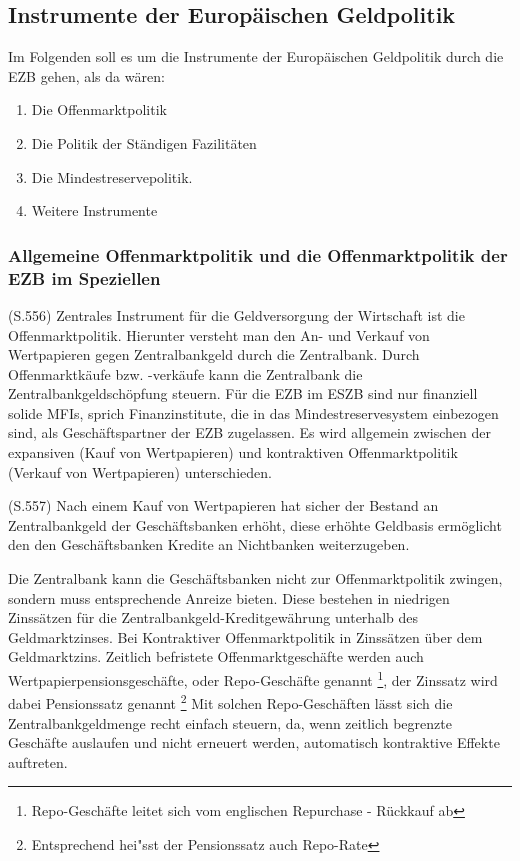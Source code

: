 \documentclass[
        onecolumn,
        a4paper,
        abstracton,
        parskip=half
        ,final
        ]{scrartcl}
\begin{document}
\subsection{Instrumente der Europ{\"a}ischen Geldpolitik}

Im Folgenden soll es um die Instrumente der Europ{\"a}ischen Geldpolitik durch die EZB gehen, als da w{\"a}ren:
\begin{enumerate}
  \item{Die Offenmarktpolitik}
  \item{Die Politik der St{\"a}ndigen Fazilit{\"a}ten}
  \item{Die Mindestreservepolitik.}
  \item{Weitere Instrumente}
\end{enumerate}




\subsubsection{Allgemeine Offenmarktpolitik und die Offenmarktpolitik der EZB im Speziellen}

(S.556)
Zentrales Instrument f{\"u}r die Geldversorgung der Wirtschaft ist die Offenmarktpolitik. Hierunter versteht man den An- und Verkauf von Wertpapieren gegen Zentralbankgeld durch die Zentralbank.
Durch Offenmarktk{\"a}ufe bzw. -verk{\"a}ufe kann die Zentralbank die Zentralbankgeldsch{\"o}pfung steuern. F{\"u}r die EZB im ESZB sind nur finanziell solide MFIs, sprich Finanzinstitute, die in das Mindestreservesystem einbezogen sind, als Gesch{\"a}ftspartner der EZB zugelassen.
Es wird allgemein zwischen der expansiven (Kauf von Wertpapieren) und kontraktiven Offenmarktpolitik (Verkauf von Wertpapieren) unterschieden.

(S.557)
Nach einem Kauf von Wertpapieren hat sicher der Bestand an Zentralbankgeld der Gesch{\"a}ftsbanken erh{\"o}ht, diese erh{\"o}hte Geldbasis erm{\"o}glicht den den Gesch{\"a}ftsbanken Kredite an Nichtbanken weiterzugeben.

Die Zentralbank kann die Gesch{\"a}ftsbanken nicht zur Offenmarktpolitik zwingen, sondern muss entsprechende Anreize bieten. Diese bestehen in niedrigen Zinss{\"a}tzen f{\"u}r die Zentralbankgeld-Kreditgew{\"a}hrung unterhalb des Geldmarktzinses. Bei Kontraktiver Offenmarktpolitik in Zinss{\"a}tzen {\"u}ber dem Geldmarktzins.
Zeitlich befristete Offenmarktgesch{\"a}fte werden auch Wertpapierpensionsgesch{\"a}fte, oder Repo-Gesch{\"a}fte genannt \footnote[36]{Repo-Gesch{\"a}fte leitet sich vom englischen Repurchase - R{\"u}ckkauf ab}, der Zinssatz wird dabei Pensionssatz genannt \footnote[37]{Entsprechend hei{"ss}t der Pensionssatz auch Repo-Rate}
Mit solchen Repo-Gesch{\"a}ften l{\"a}sst sich die Zentralbankgeldmenge recht einfach steuern, da, wenn zeitlich begrenzte Gesch{\"a}fte auslaufen und nicht erneuert werden, automatisch kontraktive Effekte auftreten.
\end{document}
